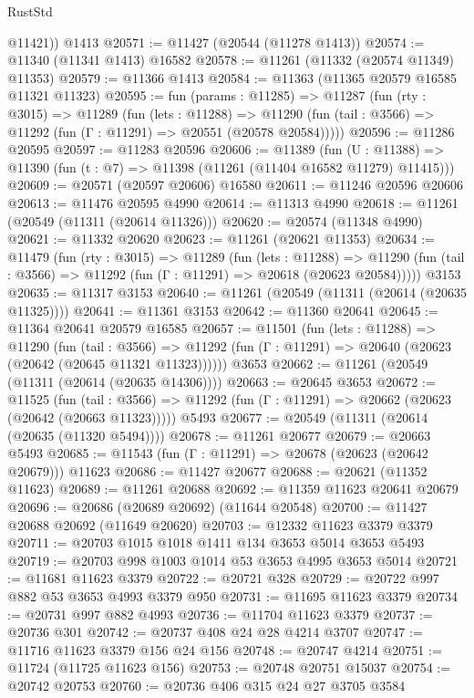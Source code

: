 \begin{lexlean}{RustStd}
\begin{coremodule}
        @11421))
    @1413
@20571 := @11427 (@20544 (@11278 @1413))
@20574 := @11340 (@11341 @1413) @16582
@20578 := @11261 (@11332 (@20574 @11349) @11353)
@20579 := @11366 @1413
@20584 := @11363 (@11365 @20579 @16585 @11321 @11323)
@20595 := fun (params : @11285) =>
  @11287
    (fun (rty : @3015) =>
    @11289
      (fun (lets : @11288) =>
      @11290 (fun (tail : @3566) => @11292 (fun (Γ : @11291) => @20551 (@20578 @20584)))))
@20596 := @11286 @20595
@20597 := @11283 @20596
@20606 := @11389
    (fun (U : @11388) => @11390 (fun (t : @7) => @11398 (@11261 (@11404 @16582 @11279) @11415)))
@20609 := @20571 (@20597 @20606) @16580
@20611 := @11246 @20596 @20606
@20613 := @11476 @20595 @4990
@20614 := @11313 @4990
@20618 := @11261 (@20549 (@11311 (@20614 @11326)))
@20620 := @20574 (@11348 @4990)
@20621 := @11332 @20620
@20623 := @11261 (@20621 @11353)
@20634 := @11479
    (fun (rty : @3015) =>
    @11289
      (fun (lets : @11288) =>
      @11290 (fun (tail : @3566) => @11292 (fun (Γ : @11291) => @20618 (@20623 @20584)))))
    @3153
@20635 := @11317 @3153
@20640 := @11261 (@20549 (@11311 (@20614 (@20635 @11325))))
@20641 := @11361 @3153
@20642 := @11360 @20641
@20645 := @11364 @20641 @20579 @16585
@20657 := @11501
    (fun (lets : @11288) =>
    @11290
      (fun (tail : @3566) =>
      @11292 (fun (Γ : @11291) => @20640 (@20623 (@20642 (@20645 @11321 @11323))))))
    @3653
@20662 := @11261 (@20549 (@11311 (@20614 (@20635 @14306))))
@20663 := @20645 @3653
@20672 := @11525
    (fun (tail : @3566) => @11292 (fun (Γ : @11291) => @20662 (@20623 (@20642 (@20663 @11323)))))
    @5493
@20677 := @20549 (@11311 (@20614 (@20635 (@11320 @5494))))
@20678 := @11261 @20677
@20679 := @20663 @5493
@20685 := @11543 (fun (Γ : @11291) => @20678 (@20623 (@20642 @20679))) @11623
@20686 := @11427 @20677
@20688 := @20621 (@11352 @11623)
@20689 := @11261 @20688
@20692 := @11359 @11623 @20641 @20679
@20696 := @20686 (@20689 @20692) (@11644 @20548)
@20700 := @11427 @20688 @20692 (@11649 @20620)
@20703 := @12332 @11623 @3379 @3379
@20711 := @20703 @1015 @1018 @1411 @134 @3653 @5014 @3653 @5493
@20719 := @20703 @998 @1003 @1014 @53 @3653 @4995 @3653 @5014
@20721 := @11681 @11623 @3379
@20722 := @20721 @328
@20729 := @20722 @997 @882 @53 @3653 @4993 @3379 @950
@20731 := @11695 @11623 @3379
@20734 := @20731 @997 @882 @4993
@20736 := @11704 @11623 @3379
@20737 := @20736 @301
@20742 := @20737 @408 @24 @28 @4214 @3707
@20747 := @11716 @11623 @3379 @156 @24 @156
@20748 := @20747 @4214
@20751 := @11724 (@11725 @11623 @156)
@20753 := @20748 @20751 @15037
@20754 := @20742 @20753
@20760 := @20736 @406 @315 @24 @27 @3705 @3584

\end{coremodule}
\end{lexlean}
